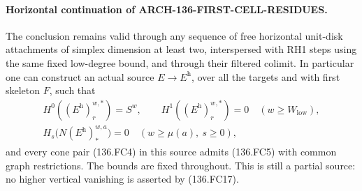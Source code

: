 \paragraph{Horizontal continuation of ARCH-136-FIRST-CELL-RESIDUES.}
The conclusion remains valid through any sequence of free horizontal
unit-disk attachments of simplex dimension at least two, interspersed
with RH1 steps using the same fixed low-degree bound, and through
their filtered colimit. In particular one can construct an actual
source \(E\to E^{\mathrm h}\), over all the targets and with
first skeleton \(F\), such that
\[
\begin{gathered}
 H^0((E^{\mathrm h})_r^{w,*})=S^w,\qquad
 H^1((E^{\mathrm h})_r^{w,*})=0\quad(w\geq W_{\mathrm{low}}),\\
 H_s\bigl(N(E^{\mathrm h})_*^{w,a}\bigr)=0
                      \quad(w\geq\mu(a),\ s\geq0),
\end{gathered}                                             \tag{136.FC17}
\]
and every cone pair (136.FC4) in this source admits (136.FC5)
with common graph restrictions. The bounds are fixed throughout.
This is still a partial source: no higher vertical vanishing is
asserted by (136.FC17).

